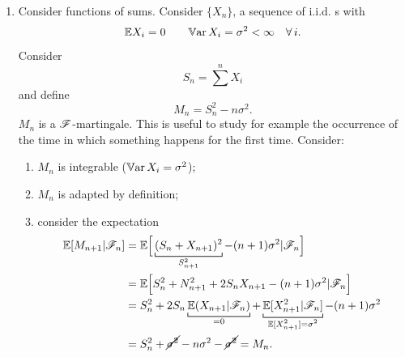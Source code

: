 \documentclass{report}
\begin{document}
\begin{enumerate}
	\begin{enumerate}
		\item $M$ is adapted to $\F$ by definition;
		\item $\every M_{n}$ is integrable: consider $\norm{M_{n}}\leq\norm{M_{n-1}}\norm{R_{n}}$ since $M_{n}=M_{n-1}R_{n}$. But since $R_{n}$ has finite variance then $\norm{M_{n-1}}\norm{R_{n}}<\infty$. So since it is bounded it is integrable;
		\item consider the expectation
		\begin{align*}
			\ev[M_{n+1}|\F_{n}]&=\ev[M_{n}R_{n+1}|\F_{n}]\\
			&=M_{n}\ev[R_{n+1}|\F_{n}] \qquad\text{(beacuse $M_n$ is $\F_n$-meas.)}\\
			&=M_{n}\ev[R_{n+1}]\\
			&=M_{n}.
		\end{align*}
	\end{enumerate}
	\begin{example}
		This is considered a good model for finance: $M_{n}$ is the price of a share at time $n$ and $R_{n+1}$ is the return at time $(n+1)$ per euro invested at time $n$. $\F_n$ is the information that is available to the whole market.
	\end{example}
	\item  Consider functions of sums. Consider $\{X_{n}\}$, a sequence of i.i.d. \rv s with
	\[\mathbb{E} X_i=0\qquad\mathbb{V}\mathrm{ar}\, X_i=\sigma^{2}<\infty\quad\forall\, i.\]
	Consider
	\[S_{n}=\sum^{n}X_i\]
	and define
	\[M_{n}=S_{n}^{2}-n\sigma^{2}.\]
	$M_n$ is a $\F$-martingale. This is useful to study for example the occurrence of the time in which something happens for the first time. 
	Consider:
	\begin{enumerate}
		\item $M_{n}$ is integrable ($\mathbb{V}\mathrm{ar}\, X_i=\sigma^{2}$);
		\item $M_{n}$ is adapted by definition;
		\item consider the expectation 
		\begin{align*}
			\ev[M_{n+1}|\F_{n}]&=\ev\Big[\underbracket[0.6pt]{(S_{n}+X_{n+1})^{2}}_{S^{2}_{n+1}}-(n+1)\sigma^{2}|\F_{n}\Big]\\
			&=\ev\Big[S_{n}^{2}+N_{n+1}^{2}+2S_{n}X_{n+1}-(n+1)\sigma^{2}|\F_{n}\Big]\\
			&=S_{n}^{2}+2S_{n}\underbracket[0.6pt]{\ev(X_{n+1}|\F_{n})}_{=0}+\underbracket[0.6pt]{\ev[X_{n+1}^{2}|\F_{n}]}_{\mathclap{\ev[X^{2}_{n+1}]=\sigma^{2}}}-(n+1)\sigma^{2}\\
			&=S_{n}^{2}+\cancel{\sigma^{2}}-n\sigma^{2}-\cancel{\sigma^{2}}=M_{n}.

\end{align*}
\end{enumerate}
\end{enumerate}
\end{document}
